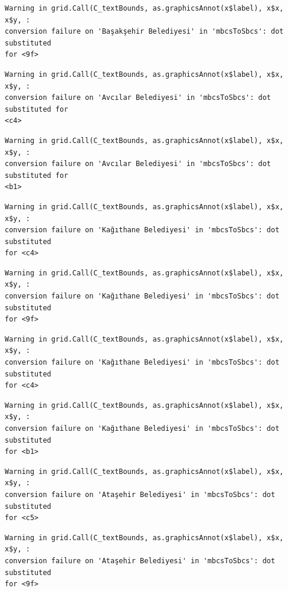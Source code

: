 \documentclass[
  11pt,
  a4paper,
  DIV=11,
  numbers=noendperiod]{scrartcl}
\begin{document}
\begin{verbatim}
Warning in grid.Call(C_textBounds, as.graphicsAnnot(x$label), x$x, x$y, :
conversion failure on 'Başakşehir Belediyesi' in 'mbcsToSbcs': dot substituted
for <9f>
\end{verbatim}

\begin{verbatim}
Warning in grid.Call(C_textBounds, as.graphicsAnnot(x$label), x$x, x$y, :
conversion failure on 'Avcılar Belediyesi' in 'mbcsToSbcs': dot substituted for
<c4>
\end{verbatim}

\begin{verbatim}
Warning in grid.Call(C_textBounds, as.graphicsAnnot(x$label), x$x, x$y, :
conversion failure on 'Avcılar Belediyesi' in 'mbcsToSbcs': dot substituted for
<b1>
\end{verbatim}

\begin{verbatim}
Warning in grid.Call(C_textBounds, as.graphicsAnnot(x$label), x$x, x$y, :
conversion failure on 'Kağıthane Belediyesi' in 'mbcsToSbcs': dot substituted
for <c4>
\end{verbatim}

\begin{verbatim}
Warning in grid.Call(C_textBounds, as.graphicsAnnot(x$label), x$x, x$y, :
conversion failure on 'Kağıthane Belediyesi' in 'mbcsToSbcs': dot substituted
for <9f>
\end{verbatim}

\begin{verbatim}
Warning in grid.Call(C_textBounds, as.graphicsAnnot(x$label), x$x, x$y, :
conversion failure on 'Kağıthane Belediyesi' in 'mbcsToSbcs': dot substituted
for <c4>
\end{verbatim}

\begin{verbatim}
Warning in grid.Call(C_textBounds, as.graphicsAnnot(x$label), x$x, x$y, :
conversion failure on 'Kağıthane Belediyesi' in 'mbcsToSbcs': dot substituted
for <b1>
\end{verbatim}

\begin{verbatim}
Warning in grid.Call(C_textBounds, as.graphicsAnnot(x$label), x$x, x$y, :
conversion failure on 'Ataşehir Belediyesi' in 'mbcsToSbcs': dot substituted
for <c5>
\end{verbatim}

\begin{verbatim}
Warning in grid.Call(C_textBounds, as.graphicsAnnot(x$label), x$x, x$y, :
conversion failure on 'Ataşehir Belediyesi' in 'mbcsToSbcs': dot substituted
for <9f>
\end{verbatim}
\end{document}
